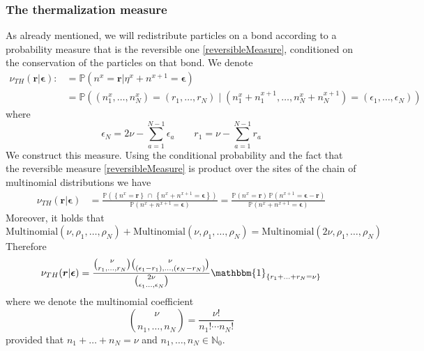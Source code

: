 \documentclass[10pt]{article}
\numberwithin{equation}{section}
\numberwithin{equation}{subsection}
\begin{document}
\subsubsection{The thermalization measure}
As already mentioned, we will redistribute particles on a bond according to a probability measure that is the reversible one \eqref{reversibleMeasure}, conditioned on the conservation of the particles on that bond. We denote
\begin{equation}
	\begin{split}
	\nu_{TH}(\bm{r}|\bm{\epsilon}):&=\mathbb{P}\left(n^{x}=\bm{r}|\eta^{x}+n^{x+1}=\bm{\epsilon}\right)
	\\&
	=\mathbb{P}\left((n_{1}^{x},\ldots,n_{N}^{x})=
	(r_{1},\ldots,r_{N})\;|\;(n_{1}^{x}+n_{1}^{x+1},\ldots,n_{N}^{x}+n_{N}^{x+1})=(\epsilon_{1},\ldots,\epsilon_{N})\right)
	\end{split}
\end{equation}
where
\begin{equation}
	\epsilon_{N}=2\nu-\sum_{a=1}^{N-1}\epsilon_{a}\qquad r_{1}=\nu-\sum_{a=1}^{N-1}r_{a}
\end{equation}
We construct this measure. Using the conditional probability and the fact that the reversible measure \eqref{reversibleMeasure} is product over the sites of the chain of multinomial distributions we have
\begin{equation}
	\begin{split}
\nu_{TH}(\bm{r}|\bm{\epsilon})&=\frac{\mathbb{P}\left(\left\{n^{x}=\bm{r}\right\}\,\cap\,\left\{n^{x}+n^{x+1}=\bm{\epsilon}\right\}\right)}{\mathbb{P}\left(n^{x}+n^{x+1}=\bm{\epsilon}\right)}=\frac{\mathbb{P}\left(n^{x}=\bm{r}\right)\,\mathbb{P}\left(n^{x+1}=\bm{\epsilon}-\bm{r}\right)}{\mathbb{P}\left(n^{x}+n^{x+1}=\bm{\epsilon}\right)}
	\end{split}
\end{equation}
Moreover, it holds that 
\begin{equation}
\text{Multinomial}(\nu,\rho_{1},\ldots,\rho_{N})+\text{Multinomial}(\nu,\rho_{1},\ldots,\rho_{N})=\text{Multinomial}(2\nu,\rho_{1},\ldots,\rho_{N})
\end{equation}
Therefore 
\begin{equation}
	\begin{split}
	\nu_{TH}(\bm{r}|\bm{\epsilon})=\frac{\binom{\nu}{r_{1},\ldots,r_{N}}\binom{\nu}{(\epsilon_{1}-r_{1}),\ldots,(\epsilon_{N}-r_{N})}}{\binom{2\nu}{\epsilon_{1}\ldots,\epsilon_{N}}}\mathbbm{1}_{\{r_{1}+\ldots+r_{N}=\nu\}}
	\end{split}
\end{equation}
where we denote the multinomial coefficient
\begin{equation}
	\binom{\nu}{n_{1},\ldots,n_{N}}=\frac{\nu!}{n_{1}!\cdots n_{N}!}
\end{equation}
provided that $n_{1}+\ldots+n_{N}=\nu$ and $n_{1},\ldots,n_{N}\in \mathbb{N}_{0}$. 
\end{document}
